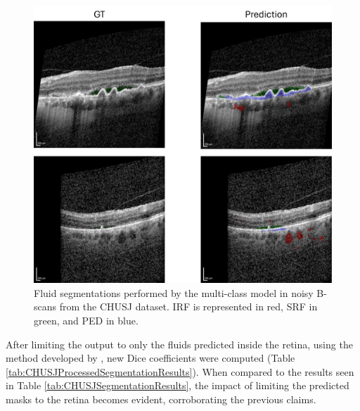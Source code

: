 \begin{figure}[!ht]
	\centering	\includegraphics[width=0.75\linewidth]{figures/CHUSJSegmentationOnNoisyScans.png}
	\caption{Fluid segmentations performed by the multi-class model in noisy B-scans from the CHUSJ dataset. IRF is represented in red, SRF in green, and PED in blue.}
	\label{fig:CHUSJSegmentationOnNoisyScans}
\end{figure}

After limiting the output to only the fluids predicted inside the retina, using the method developed by \textcite{Melo2023}, new Dice coefficients were computed (Table \ref{tab:CHUSJProcessedSegmentationResults}). When compared to the results seen in Table \ref{tab:CHUSJSegmentationResults}, the impact of limiting the predicted masks to the retina becomes evident, corroborating the previous claims.

